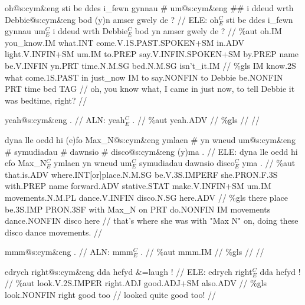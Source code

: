 \documentclass[a4paper,10pt]{article}
\begin{document}
\ex
\begingl[lingstyle=gergl]
\glchat oh@s:cym\&eng sti be ddes i\_fewn gynnau \# um@s:cym\&eng \#\# i ddeud wrth Debbie@s:cym\&eng bod (y)n amser gwely de ? //
\glsurface ELE:  oh$^{C}_{E}$ sti be ddes i\_fewn gynnau um$^{C}_{E}$ i ddeud wrth Debbie$^{C}_{E}$ bod yn amser gwely de ?  //
\glauto \%aut  oh{\scriptsize .IM} you\_know{\scriptsize .IM} what{\scriptsize .INT} come{\scriptsize .V.1S.PAST.SPOKEN+SM} in{\scriptsize .ADV} light{\scriptsize .V.INFIN+SM} um{\scriptsize .IM} to{\scriptsize .PREP} say{\scriptsize .V.INFIN.SPOKEN+SM} by{\scriptsize .PREP} name be{\scriptsize .V.INFIN} yn{\scriptsize .PRT} time{\scriptsize .N.M.SG} bed{\scriptsize .N.M.SG} isn't\_it{\scriptsize .IM}   //
\glmanual \%gls  IM know{\scriptsize .2S} what come{\scriptsize .1S.PAST} in just\_now IM to say{\scriptsize .NONFIN} to Debbie be{\scriptsize .NONFIN} PRT time bed TAG   //
\gleng oh, you know what, I came in just now, to tell Debbie it was bedtime, right? //
\endgl
\xe

\ex
\begingl[lingstyle=gergl]
\glchat yeah@s:cym\&eng . //
\glsurface ALN:  yeah$^{C}_{E}$ .  //
\glauto \%aut  yeah{\scriptsize .ADV}   //
\glmanual \%gls     //
\gleng  //
\endgl
\xe

\ex
\begingl[lingstyle=gergl]
\glchat dyna lle oedd hi (e)fo Max\_N@s:cym\&eng ymlaen \# yn wneud um@s:cym\&eng \# symudiadau \# dawnsio \# disco@s:cym\&eng (y)ma . //
\glsurface ELE:  dyna lle oedd hi efo Max\_N$^{C}_{E}$ ymlaen yn wneud um$^{C}_{E}$ symudiadau dawnsio disco$^{C}_{E}$ yma .  //
\glauto \%aut  that{\scriptsize .is.ADV} where{\scriptsize .INT[or]place.N.M.SG} be{\scriptsize .V.3S.IMPERF} she{\scriptsize .PRON.F.3S} with{\scriptsize .PREP} name forward{\scriptsize .ADV} stative{\scriptsize .STAT} make{\scriptsize .V.INFIN+SM} um{\scriptsize .IM} movements{\scriptsize .N.M.PL} dance{\scriptsize .V.INFIN} disco{\scriptsize .N.SG} here{\scriptsize .ADV}   //
\glmanual \%gls  there place be{\scriptsize .3S.IMP} PRON{\scriptsize .3SF} with Max\_N on PRT do{\scriptsize .NONFIN} IM movements dance{\scriptsize .NONFIN} disco here   //
\gleng that's where she was with "Max N" on, doing these disco dance movements. //
\endgl
\xe

\ex
\begingl[lingstyle=gergl]
\glchat mmm@s:cym\&eng . //
\glsurface ALN:  mmm$^{C}_{E}$ .  //
\glauto \%aut  mmm{\scriptsize .IM}   //
\glmanual \%gls     //
\gleng  //
\endgl
\xe

\ex
\begingl[lingstyle=gergl]
\glchat edrych right@s:cym\&eng dda hefyd \&=laugh ! //
\glsurface ELE:  edrych right$^{C}_{E}$ dda hefyd !  //
\glauto \%aut  look{\scriptsize .V.2S.IMPER} right{\scriptsize .ADJ} good{\scriptsize .ADJ+SM} also{\scriptsize .ADV}   //
\glmanual \%gls  look{\scriptsize .NONFIN} right good too   //
\gleng looked quite good too! //
\endgl
\xe
\end{document}
